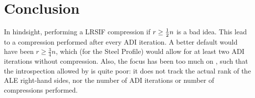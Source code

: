 \chapter{Conclusion}

In hindsight, performing a \ac{LRSIF} compression if $r \geq \tfrac{1}{2} n$ is a bad idea.
This lead to a compression performed after every \ac{ADI} iteration.
A better default would have been \eg $r \geq \frac{3}{4} n$,
which (for the Steel Profile) would allow for at least two \ac{ADI} iterations without compression.
Also, the focus has been too much on ,
such that the introspection allowed by  is quite poor:
it does not track the actual rank of the \ac{ALE} right-hand sides,
nor the number of \ac{ADI} iterations or number of compressions performed.
